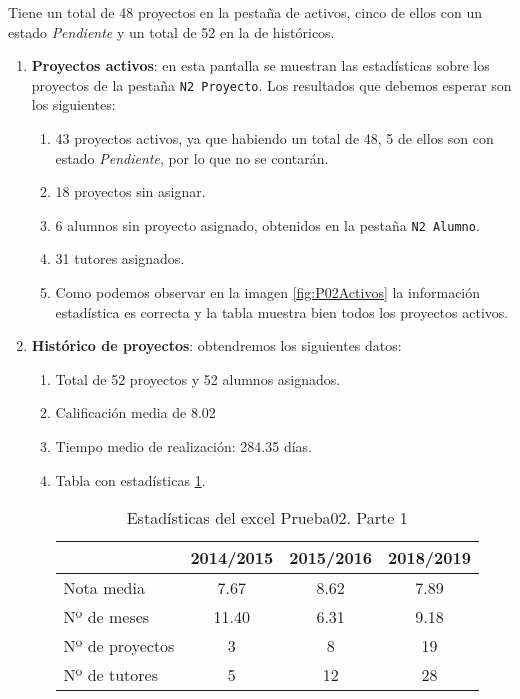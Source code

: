 Tiene un total de 48 proyectos en la pestaña de activos, cinco de ellos con un estado \emph{Pendiente} y un total de 52 en la de históricos.

\begin{enumerate}
	\item \textbf{Proyectos activos}: en esta pantalla se muestran las estadísticas sobre los proyectos de la pestaña \texttt{N2 Proyecto}. Los resultados que debemos esperar son los siguientes:
	\begin{enumerate}
		\item 43 proyectos activos, ya que habiendo un total de 48, 5 de ellos son con estado \emph{Pendiente}, por lo que no se contarán.
		\item 18 proyectos sin asignar.
		\item 6 alumnos sin proyecto asignado, obtenidos en la pestaña \texttt{N2 Alumno}.
		\item 31 tutores asignados.
		
		\item  Como podemos observar en la imagen \ref{fig:P02Activos} la información estadística es correcta y la tabla muestra bien todos los proyectos activos.
	\end{enumerate}
	
	\item \textbf{Histórico de proyectos}: obtendremos los siguientes datos:
	\begin{enumerate}
		\item Total de 52 proyectos y 52 alumnos asignados.
		\item Calificación media de 8.02
		\item Tiempo medio de realización: 284.35 días.		
		\item Tabla con estadísticas \ref{P02Historico1}.
		
		 \begin{table}[]
			\label{P02Historico1}
			\centering
			\begin{tabular}{|l|c|c|c|}
				\hline
				\multicolumn{1}{|c|}{\textbf{}} & \textbf{2014/2015} & \textbf{2015/2016} & \textbf{2018/2019}\\\hline
				Nota media & 7.67 & 8.62  & 7.89 \\ \hline
				Nº de meses & 11.40  & 6.31 & 9.18 \\ \hline
				Nº de proyectos  & 3  & 8 &19 \\ \hline
				Nº de tutores  &  5 &12  & 28  \\ \hline
			\end{tabular}
			\caption{Estadísticas del excel Prueba02. Parte 1}
		\end{table}
	

\end{enumerate}
\end{enumerate}
